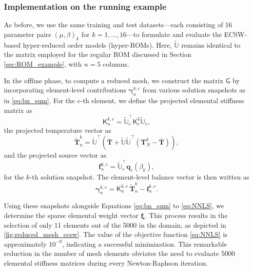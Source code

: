 \documentclass[11pt]{article}
\renewcommand{\vec}[1]{\mathbf{#1}}
\newcommand{\mat}[1]{\mathsf{#1}}
\begin{document}
        \subsubsection*{Implementation on the running example}
        As before, we use the same training and test datasets—each consisting of 16 parameter pairs \((\mu, \beta)_k\) for \(k=1, \ldots, 16\)—to formulate and evaluate the ECSW-based hyper-reduced order models (hyper-ROMs).
        Here, \(\widetilde{\mathbb{U}}\) remains identical to the matrix employed for the regular ROM discussed in Section \ref{sec:ROM_example}, with \(n=5\) columns.


        In the offline phase, to compute a reduced mesh, we construct the matrix $\mat{G}$ by incorporating element-level contributions $\boldsymbol{\gamma}^{k,e}_n$ from various solution snapshots as in \cref{eq:bn_sum}.
        For the $e$-th element, we define the projected elemental stiffness matrix as
        \begin{equation}
            \mat{K}^{k,e}_n = \widetilde{\mathbb{U}}_e^{\top} \mat{K}^{k}_e \widetilde{\mathbb{U}}_e,
        \end{equation}
        the projected temperature vector as
        \begin{equation}
            \widetilde{\vec{T}}^k_n = \widetilde{\mathbb{U}}^{\top} \left( \overline{\vec{T}} +  \widetilde{\mathbb{U}}\widetilde{\mathbb{U}}^{\top}\left(\vec{T}^{k}_N - \overline{\vec{T}}\right) \right),
            \label{eq:red_snapshot}
        \end{equation}
        and the projected source vector as
        \begin{equation}
            \vec{f}^{k,e}_n = \widetilde{\mathbb{U}}_e^{\top} \vec{q}_e(\beta_k),
        \end{equation}
        for the $k$-th solution snapshot.
        The element-level balance vector is then written as
        \begin{equation}
            \boldsymbol{\gamma}^{k,e}_{n} = \mat{K}^{k,e}_n \,\widetilde{\vec{T}}^k_n - \vec{f}^{k,e}_n.
            \label{eq:gamma_n_exampleP}
        \end{equation}


        Using these snapshots alongside Equations \eqref{eq:bn_sum} to \eqref{eq:NNLS}, we determine the sparse elemental weight vector $\boldsymbol{\xi}$.
        This process results in the selection of only 11 elements out of the 5000 in the domain, as depicted in \cref{fig:reduced_mesh_ecsw}.
        The value of the objective function \cref{eq:NNLS} is approximately $10^{-9}$, indicating a successful minimization.
        This remarkable reduction in the number of mesh elements obviates the need to evaluate 5000 elemental stiffness matrices during every Newton-Raphson iteration.
\end{document}
